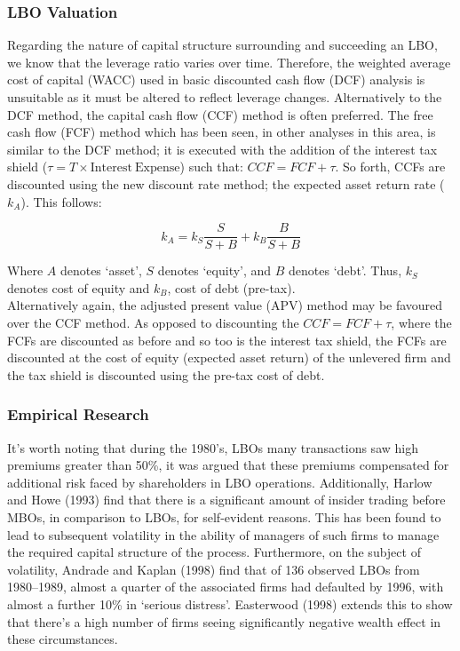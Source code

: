 \documentclass[11pt, english]{article}
\begin{document}
		\subsubsection*{LBO Valuation}

	Regarding the nature of capital structure surrounding and succeeding an LBO, we know that the leverage ratio varies over time. Therefore, the weighted average cost of capital (WACC) used in basic discounted cash flow (DCF) analysis is unsuitable as it must be altered to reflect leverage changes. Alternatively to the DCF method, the capital cash flow (CCF) method is often preferred. The free cash flow (FCF) method which has been seen, in other analyses in this area, is similar to the DCF method; it is executed with the addition of the interest tax shield ($\tau=T\times\mathrm{Interest\ Expense}$) such that: $CCF=FCF+\tau$. So forth, CCFs are discounted using the new discount rate method; the expected asset return rate ($k_A$). This follows:

	$$k_A=k_S\frac{S}{S+B}+k_B\frac{B}{S+B}$$

	Where $A$ denotes `asset', $S$ denotes `equity', and $B$ denotes `debt'. Thus, $k_S$ denotes cost of equity and $k_B$, cost of debt (pre-tax).\\
		
	Alternatively again, the adjusted present value (APV) method may be favoured over the CCF method. As opposed to discounting the $CCF=FCF+\tau$, where the FCFs are discounted as before and so too is the interest tax shield, the FCFs are discounted at the cost of equity (expected asset return) of the unlevered firm and the tax shield is discounted using the pre-tax cost of debt.

	\subsubsection*{Empirical Research}

	It's worth noting that during the 1980's, LBOs many transactions saw high premiums greater than 50\%, it was argued that these premiums compensated for additional risk faced by shareholders in LBO operations. Additionally, Harlow and Howe (1993) find that there is a significant amount of insider trading before MBOs, in comparison to LBOs, for self-evident reasons. This has been found to lead to subsequent volatility in the ability of managers of such firms to manage the required capital structure of the process. Furthermore, on the subject of volatility, Andrade and Kaplan (1998) find that of 136 observed LBOs from 1980--1989, almost a quarter of the associated firms had defaulted by 1996, with almost a further 10\% in `serious distress'. Easterwood (1998) extends this to show that there's a high number of firms seeing significantly negative wealth effect in these circumstances.\\
\end{document}
